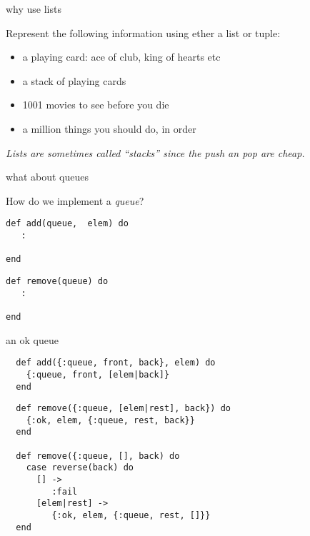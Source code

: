 \begin{frame}[fragile]{why use lists}

Represent the following information using ether a list or tuple:
                   
\begin{itemize}
\pause \item a playing card: ace of club, king of hearts etc 
\pause \item a stack of playing cards
\pause \item 1001 movies to see before you die
\pause \item a million things you should do, in order
\end{itemize}

\pause\vspace{20pt}
{\em Lists are sometimes called ``stacks'' since the push an pop are cheap.}
\end{frame}

\begin{frame}[fragile]{what about queues}


  How do we implement a {\em queue}?

\begin{verbatim}
def add(queue,  elem) do
   :

end
\end{verbatim}

\begin{verbatim}
def remove(queue) do
   :

end
\end{verbatim}  
  
\end{frame}

\begin{frame}[fragile]{an ok queue}

\begin{verbatim}
  def add({:queue, front, back}, elem) do
    {:queue, front, [elem|back]}
  end
\end{verbatim}

\begin{verbatim}
  def remove({:queue, [elem|rest], back}) do
    {:ok, elem, {:queue, rest, back}}
  end

  def remove({:queue, [], back) do 
    case reverse(back) do
      [] -> 
         :fail
      [elem|rest] ->
         {:ok, elem, {:queue, rest, []}}
  end
\end{verbatim}
  
\end{frame}


